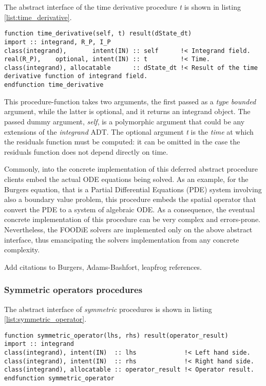 \documentclass[pdftex,preprint,3p,times,numbers]{elsarticle}
\begin{document}
The abstract interface of the time derivative procedure \emph{t} is shown in listing \ref{list:time_derivative}.

\begin{lstlisting}[firstnumber=1,style=code,caption={time derivative procedure interface},label={list:time_derivative}]
function time_derivative(self, t) result(dState_dt)
import :: integrand, R_P, I_P
class(integrand),       intent(IN) :: self      !< Integrand field.
real(R_P),    optional, intent(IN) :: t         !< Time.
class(integrand), allocatable      :: dState_dt !< Result of the time derivative function of integrand field.
endfunction time_derivative
\end{lstlisting}

This procedure-function takes two arguments, the first passed as a \emph{type bounded} argument, while the latter is optional, and it returns an integrand object. The passed dummy argument, \emph{self}, is a polymorphic argument that could be any extensions of the \emph{integrand} ADT. The optional argument \emph{t} is the \emph{time} at which the residuals function must be computed: it can be omitted in the case the residuals function does not depend directly on time.

Commonly, into the concrete implementation of this deferred abstract procedure clients embed the actual ODE equations being solved. As an example, for the Burgers equation, that is a Partial Differential Equations (PDE) system involving also a boundary value problem, this procedure embeds the spatial operator that convert the PDE to a system of algebraic ODE. As a consequence, the eventual concrete implementation of this procedure can be very complex and errors-prone. Nevertheless, the FOODiE solvers are implemented only on the above abstract interface, thus emancipating the solvers implementation from any concrete complexity.

{\color{red} Add citations to Burgers, Adams-Bashfort, leapfrog references.}

\subsubsection{Symmetric operators procedures}

The abstract interface of \emph{symmetric} procedures is shown in listing \ref{list:symmetric_operator}.

\begin{lstlisting}[firstnumber=1,style=code,caption={symmetric operator procedure interface},label={list:symmetric_operator}]
function symmetric_operator(lhs, rhs) result(operator_result)
import :: integrand
class(integrand), intent(IN)  :: lhs             !< Left hand side.
class(integrand), intent(IN)  :: rhs             !< Right hand side.
class(integrand), allocatable :: operator_result !< Operator result.
endfunction symmetric_operator
\end{lstlisting}
\end{document}
